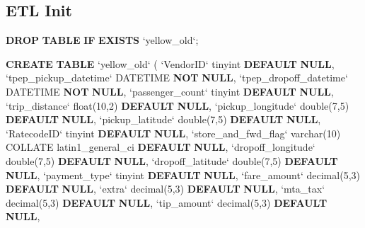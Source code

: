 \documentclass[12pt,twoside]{reedthesis}
\newenvironment{Shaded}{\begin{snugshade}}{\end{snugshade}}
\newcommand{\KeywordTok}[1]{\textcolor[rgb]{0.13,0.29,0.53}{\textbf{#1}}}
\newcommand{\DataTypeTok}[1]{\textcolor[rgb]{0.13,0.29,0.53}{#1}}
\newcommand{\DecValTok}[1]{\textcolor[rgb]{0.00,0.00,0.81}{#1}}
\newcommand{\NormalTok}[1]{#1}
\theoremstyle{definition}
\theoremstyle{definition}
\theoremstyle{definition}
\theoremstyle{remark}
\begin{document}
\subsection{ETL Init}\label{etl-init}
\begin{Shaded}
\begin{Highlighting}[]
\KeywordTok{DROP} \KeywordTok{TABLE} \KeywordTok{IF} \KeywordTok{EXISTS}\NormalTok{ `yellow_old`;}

\KeywordTok{CREATE} \KeywordTok{TABLE}\NormalTok{ `yellow_old` (}
\NormalTok{ `VendorID` tinyint }\KeywordTok{DEFAULT} \KeywordTok{NULL}\NormalTok{,}
\NormalTok{ `tpep_pickup_datetime` DATETIME }\KeywordTok{NOT} \KeywordTok{NULL}\NormalTok{,}
\NormalTok{ `tpep_dropoff_datetime` DATETIME }\KeywordTok{NOT} \KeywordTok{NULL}\NormalTok{,}
\NormalTok{ `passenger_count` tinyint }\KeywordTok{DEFAULT} \KeywordTok{NULL}\NormalTok{,}
\NormalTok{ `trip_distance` }\DataTypeTok{float}\NormalTok{(}\DecValTok{10}\NormalTok{,}\DecValTok{2}\NormalTok{) }\KeywordTok{DEFAULT} \KeywordTok{NULL}\NormalTok{,}
\NormalTok{ `pickup_longitude` }\DataTypeTok{double}\NormalTok{(}\DecValTok{7}\NormalTok{,}\DecValTok{5}\NormalTok{) }\KeywordTok{DEFAULT} \KeywordTok{NULL}\NormalTok{,}
\NormalTok{ `pickup_latitude` }\DataTypeTok{double}\NormalTok{(}\DecValTok{7}\NormalTok{,}\DecValTok{5}\NormalTok{) }\KeywordTok{DEFAULT} \KeywordTok{NULL}\NormalTok{,}
\NormalTok{ `RatecodeID` tinyint }\KeywordTok{DEFAULT} \KeywordTok{NULL}\NormalTok{,}
\NormalTok{ `store_and_fwd_flag` }\DataTypeTok{varchar}\NormalTok{(}\DecValTok{10}\NormalTok{) COLLATE latin1_general_ci }\KeywordTok{DEFAULT} \KeywordTok{NULL}\NormalTok{,}
\NormalTok{ `dropoff_longitude` }\DataTypeTok{double}\NormalTok{(}\DecValTok{7}\NormalTok{,}\DecValTok{5}\NormalTok{) }\KeywordTok{DEFAULT} \KeywordTok{NULL}\NormalTok{,}
\NormalTok{ `dropoff_latitude` }\DataTypeTok{double}\NormalTok{(}\DecValTok{7}\NormalTok{,}\DecValTok{5}\NormalTok{) }\KeywordTok{DEFAULT} \KeywordTok{NULL}\NormalTok{,}
\NormalTok{ `payment_type` tinyint }\KeywordTok{DEFAULT} \KeywordTok{NULL}\NormalTok{,}
\NormalTok{ `fare_amount` }\DataTypeTok{decimal}\NormalTok{(}\DecValTok{5}\NormalTok{,}\DecValTok{3}\NormalTok{) }\KeywordTok{DEFAULT} \KeywordTok{NULL}\NormalTok{,}
\NormalTok{ `extra` }\DataTypeTok{decimal}\NormalTok{(}\DecValTok{5}\NormalTok{,}\DecValTok{3}\NormalTok{) }\KeywordTok{DEFAULT} \KeywordTok{NULL}\NormalTok{,}
\NormalTok{ `mta_tax` }\DataTypeTok{decimal}\NormalTok{(}\DecValTok{5}\NormalTok{,}\DecValTok{3}\NormalTok{) }\KeywordTok{DEFAULT} \KeywordTok{NULL}\NormalTok{,}
\NormalTok{ `tip_amount` }\DataTypeTok{decimal}\NormalTok{(}\DecValTok{5}\NormalTok{,}\DecValTok{3}\NormalTok{) }\KeywordTok{DEFAULT} \KeywordTok{NULL}\NormalTok{,}

\end{Highlighting}
\end{Shaded}
\end{document}
